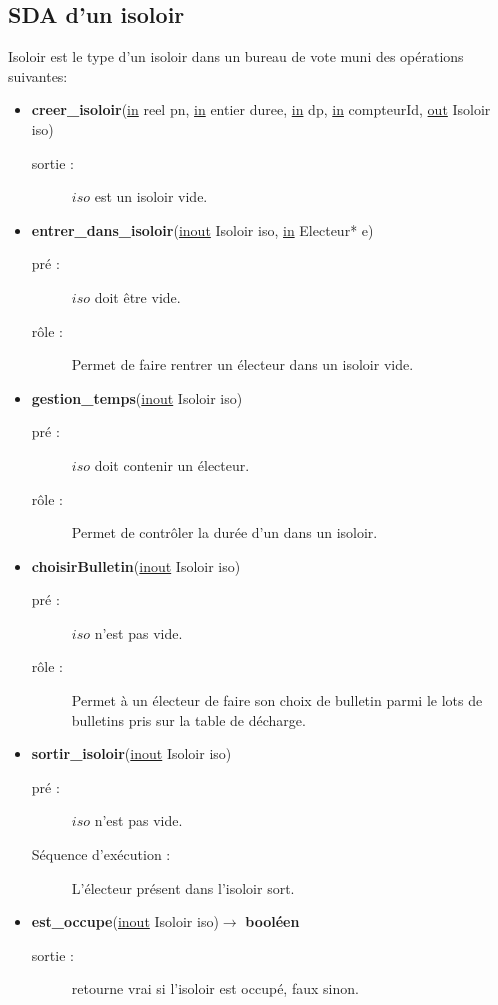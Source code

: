 \documentclass[12pt]{article} %
\begin{document}
\subsection*{SDA d'un isoloir}
Isoloir est le type d'un isoloir dans un bureau de vote muni des opérations suivantes:
\begin{itemize}
\item \textbf{creer\_isoloir}(\underline{in} reel pn, \underline{in} entier duree, \underline{in} dp, \underline{in} compteurId, \underline{out} Isoloir iso)
	\begin{description}
		\item[sortie :] $iso$ est un isoloir vide.
	\end{description}
	
	\item \textbf{entrer\_dans\_isoloir}(\underline{inout} Isoloir iso, \underline{in} Electeur* e)
	\begin{description}
		\item[pré :] $iso$ doit être vide.
		\item[rôle :] Permet de faire rentrer un électeur dans un isoloir vide.
	\end{description}
	
	\item \textbf{gestion\_temps}(\underline{inout} Isoloir iso)
	\begin{description}
		\item[pré :] $iso$ doit contenir un électeur.
		\item[rôle :] Permet de contrôler la durée d'un dans un isoloir.
	\end{description}
	\item \textbf{choisirBulletin}(\underline{inout} Isoloir iso)
	\begin{description}
		\item[pré :] $iso$ n'est pas vide.
		\item[rôle :] Permet à un électeur de faire son choix de bulletin parmi le lots de bulletins pris sur la table de décharge.
	\end{description}
	\item \textbf{sortir\_isoloir}(\underline{inout} Isoloir iso)
	\begin{description}
		\item[pré :] $iso$ n'est pas vide.
		\item[Séquence d'exécution :] L'électeur présent dans l'isoloir sort.
	\end{description}
	\item \textbf{est\_occupe}(\underline{inout} Isoloir iso)$\rightarrow$ \textbf{booléen}
	\begin{description}
		\item[sortie :] retourne vrai si l'isoloir est occupé, faux sinon.
	\end{description}
\end{itemize}
\end{document}
